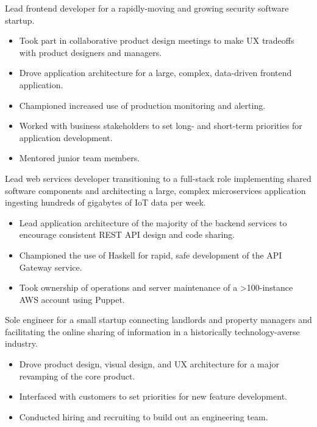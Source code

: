 \documentclass[10pt,a4paper,sans]{moderncv}        %
\begin{document}
{Lead frontend developer for a rapidly-moving and growing security software startup.
  \begin{itemize}
    \item Took part in collaborative product design meetings to make UX
      tradeoffs with product designers and managers.
    \item Drove application architecture for a large, complex, data-driven frontend
      application.
    \item Championed increased use of production monitoring and alerting.
    \item Worked with business stakeholders to set long- and short-term priorities for
      application development.
    \item Mentored junior team members.
  \end{itemize}}
{Lead web services developer transitioning to a full-stack role implementing
  shared software components and architecting a large, complex microservices
  application ingesting hundreds of gigabytes of IoT data per week.
  \begin{itemize}
    \item Lead application architecture of the majority of the backend services to
      encourage consistent REST API design and code sharing.
    \item Championed the use of Haskell for rapid, safe development of the API Gateway
      service.
    \item Took ownership of operations and server maintenance of a >100-instance AWS
      account using Puppet.
  \end{itemize}}
{Sole engineer for a small startup connecting landlords and property managers and
  facilitating the online sharing of information in a historically technology-averse
  industry.
  \begin{itemize}
    \item Drove product design, visual design, and UX architecture for a major revamping
      of the core product.
    \item Interfaced with customers to set priorities for new feature development.
    \item Conducted hiring and recruiting to build out an engineering team.
  \end{itemize}}
\end{document}
